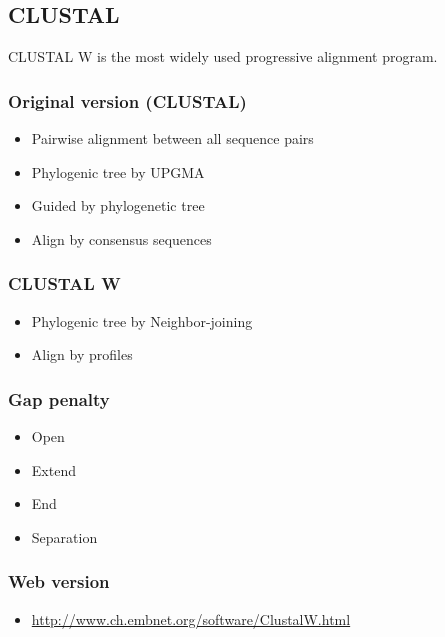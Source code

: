 %
%

%
%
\subsection{CLUSTAL}
CLUSTAL W is the most widely used progressive alignment program.

%
%
\subsubsection*{Original version (CLUSTAL)}
\begin{itemize}
\item Pairwise alignment between all sequence pairs
\item Phylogenic tree by UPGMA
\item Guided by phylogenetic tree
\item Align by consensus sequences
\end{itemize}

%
%
\subsubsection*{CLUSTAL W}
\begin{itemize}
\item Phylogenic tree by Neighbor-joining
\item Align by profiles
\end{itemize}

%
%
\subsubsection*{Gap penalty}
\begin{itemize}
\item Open
\item Extend
\item End
\item Separation
\end{itemize}

%
%
\subsubsection*{Web version}
\begin{itemize}
\item \url{http://www.ch.embnet.org/software/ClustalW.html}
\end{itemize}

\bigskip 

%
